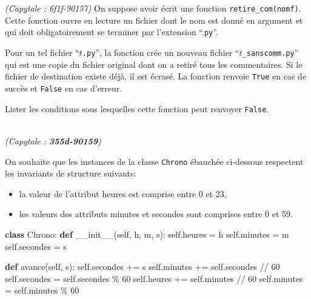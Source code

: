 \documentclass[a4paper,17pt]{extarticle}
\newenvironment{eleve}%
{\begin{activite}\color{noiramu}\\[-0.5cm]}
{\end{activite}}
\providecommand{\tightlist}{%
      \setlength{\itemsep}{0pt}\setlength{\parskip}{0pt}}
\newenvironment{Shaded}{}{}
\newcommand{\KeywordTok}[1]{\textcolor[rgb]{0.00,0.44,0.13}{\textbf{{#1}}}}
\newcommand{\DecValTok}[1]{\textcolor[rgb]{0.25,0.63,0.44}{{#1}}}
\newcommand{\FunctionTok}[1]{\textcolor[rgb]{0.02,0.16,0.49}{{#1}}}
\newcommand{\NormalTok}[1]{{#1}}
\newcommand{\VariableTok}[1]{\textcolor[rgb]{0.10,0.09,0.49}{{#1}}}
\newcommand{\OperatorTok}[1]{\textcolor[rgb]{0.40,0.40,0.40}{{#1}}}
\begin{document}
\begin{eleve}
        \end{eleve}\begin{eleve}
    \emph{(Capytale : 6f1f-90157)} On suppose avoir écrit une fonction
\texttt{retire\_com(nomf)}. Cette fonction ouvre en lecture un fichier
dont le nom est donné en argument et qui doit obligatoirement se
terminer par l'extension ``.\texttt{py}''.

Pour un tel fichier ``\(t\)\texttt{.py}'', la fonction crée un nouveau
fichier ``\(t\)\texttt{\_sanscomm.py}'' qui est une copie du fichier
original dont on a retiré tous les commentaires. Si le fichier de
destination existe déjà, il est écrasé. La fonction renvoie
\texttt{True} en cas de succès et \texttt{False} en cas d'erreur.

Lister les conditions sous lesquelles cette fonction peut renvoyer
\texttt{False}.
        
        \end{eleve}\begin{eleve}
    \emph{(Capytale : \textbf{355d-90159})}

On souhaite que les instances de la classe \texttt{Chrono} ébauchée
ci-dessous respectent les invariants de structure suivants:

\begin{itemize}
\tightlist
\item
  la valeur de l'attribut heures est comprise entre 0 et 23,
\item
  les valeurs des attributs minutes et secondes sont comprises entre 0
  et 59.
\end{itemize}

\begin{Shaded}
\begin{Highlighting}[]
\KeywordTok{class}\NormalTok{ Chrono:}
    \KeywordTok{def} \FunctionTok{\_\_init\_\_}\NormalTok{(}\VariableTok{self}\NormalTok{, h, m, s):}
        \VariableTok{self}\NormalTok{.heures   }\OperatorTok{=}\NormalTok{ h}
        \VariableTok{self}\NormalTok{.minutes  }\OperatorTok{=}\NormalTok{ m}
        \VariableTok{self}\NormalTok{.secondes }\OperatorTok{=}\NormalTok{ s}

    \KeywordTok{def}\NormalTok{ avance(}\VariableTok{self}\NormalTok{, s):}
        \VariableTok{self}\NormalTok{.secondes }\OperatorTok{+=}\NormalTok{ s}
        \VariableTok{self}\NormalTok{.minutes  }\OperatorTok{+=} \VariableTok{self}\NormalTok{.secondes }\OperatorTok{//} \DecValTok{60}
        \VariableTok{self}\NormalTok{.secondes  }\OperatorTok{=} \VariableTok{self}\NormalTok{.secondes }\OperatorTok{\%}  \DecValTok{60}
        \VariableTok{self}\NormalTok{.heures   }\OperatorTok{+=} \VariableTok{self}\NormalTok{.minutes  }\OperatorTok{//} \DecValTok{60}
        \VariableTok{self}\NormalTok{.minutes   }\OperatorTok{=} \VariableTok{self}\NormalTok{.minutes  }\OperatorTok{\%}  \DecValTok{60}
\end{Highlighting}
\end{Shaded}


\end{eleve}
\end{document}
